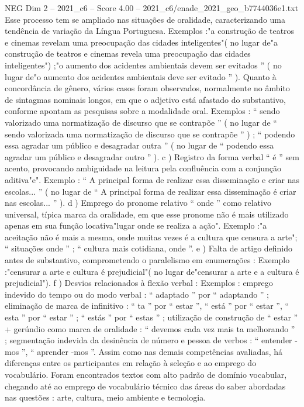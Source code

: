 \begin{textsample}{NEG Dim 2 – 2021\_c6 – Score 4.00 – 2021\_c6/enade\_2021\_geo\_b7744036e1.txt}
Esse processo tem se ampliado nas situações de oralidade, caracterizando uma tendência de variação da Língua Portuguesa.
Exemplos :"a construção de teatros e cinemas revelam uma preocupação das cidades inteligentes"( no lugar de"a construção de teatros e cinemas revela uma preocupação das cidades inteligentes") ;"o aumento dos acidentes ambientais devem ser evitados ” ( no lugar de"o aumento dos acidentes ambientais deve ser evitado ” ).
Quanto à concordância de gênero, vários casos foram observados, normalmente no âmbito de sintagmas nominais longos, em que o adjetivo está afastado do substantivo, conforme apontam as pesquisas sobre a modalidade oral.
Exemplos : “ sendo valorizado uma normatização de discurso que se contrapõe ” ( no lugar de “ sendo valorizada uma normatização de discurso que se contrapõe ” ) ; “ podendo essa agradar um público e desagradar outra ” ( no lugar de “ podendo essa agradar um público e desagradar outro ” ). c ) Registro da forma verbal “ é ” sem acento, provocando ambiguidade na leitura pela confluência com a conjunção aditiva"e".
Exemplo : “ A principal forma de realizar essa disseminação e criar nas escolas... ” ( no lugar de “ A principal forma de realizar essa disseminação é criar nas escolas... ” ). d ) Emprego do pronome relativo “ onde ” como relativo universal, típica marca da oralidade, em que esse pronome não é mais utilizado apenas em sua função locativa"lugar onde se realiza a ação".
Exemplo :"a aceitação não é mais a mesma, onde muitas vezes é a cultura que censura a arte"; “ situações onde ” ; “ cultura mais cotidiana, onde ”. e ) Falta de artigo definido antes de substantivo, comprometendo o paralelismo em enumerações : Exemplo :"censurar a arte e cultura é prejudicial"( no lugar de"censurar a arte e a cultura é prejudicial"). f ) Desvios relacionados à flexão verbal : Exemplos : emprego indevido do tempo ou do modo verbal : “ adaptado ” por “ adaptando ” ; eliminação de marca de infinitivo : “ ta ” por “ estar ”, “ está ” por “ estar ”, “ esta ” por “ estar ” ; “ estás ” por “ estas ” ; utilização de construção de “ estar ” + gerúndio como marca de oralidade : “ devemos cada vez mais ta melhorando ” ; segmentação indevida da desinência de número e pessoa de verbos : “ entender -mos ”, “ aprender -mos ”.
Assim como nas demais competências avaliadas, há diferenças entre os participantes em relação à seleção e ao emprego do vocabulário.
Foram encontrados textos com alto padrão de domínio vocabular, chegando até ao emprego de vocabulário técnico das áreas do saber abordadas nas questões : arte, cultura, meio ambiente e tecnologia.

\end{textsample}
